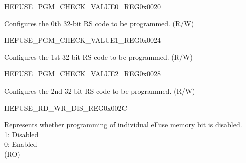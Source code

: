 \begin{register}{H}{EFUSE\_PGM\_CHECK\_VALUE0\_REG}{0x0020}\label{regdesc:EFUSEPGMCHECKVALUE0REG}
%
\regnewline%
\begin{regdesc}\begin{reglist}
\label{fielddesc:EFUSEPGMRSDATA0}\item [EFUSE\_PGM\_RS\_DATA\_0] Configures the 0th 32-bit RS code to be programmed. (R/W)
\end{reglist}\end{regdesc}
\end{register}


\begin{register}{H}{EFUSE\_PGM\_CHECK\_VALUE1\_REG}{0x0024}\label{regdesc:EFUSEPGMCHECKVALUE1REG}
%
\regnewline%
\begin{regdesc}\begin{reglist}
\label{fielddesc:EFUSEPGMRSDATA1}\item [EFUSE\_PGM\_RS\_DATA\_1] Configures the 1st 32-bit RS code to be programmed. (R/W)
\end{reglist}\end{regdesc}
\end{register}


\begin{register}{H}{EFUSE\_PGM\_CHECK\_VALUE2\_REG}{0x0028}\label{regdesc:EFUSEPGMCHECKVALUE2REG}
%
\regnewline%
\begin{regdesc}\begin{reglist}
\label{fielddesc:EFUSEPGMRSDATA2}\item [EFUSE\_PGM\_RS\_DATA\_2] Configures the 2nd 32-bit RS code to be programmed. (R/W)
\end{reglist}\end{regdesc}
\end{register}


\begin{register}{H}{EFUSE\_RD\_WR\_DIS\_REG}{0x002C}\label{regdesc:EFUSERDWRDISREG}
%
\regnewline%
\begin{regdesc}\begin{reglist}
\label{fielddesc:EFUSEWRDIS}\item [EFUSE\_WR\_DIS] Represents whether programming of individual eFuse memory bit is disabled. \\
1: Disabled\\
0: Enabled\\
(RO)
\end{reglist}\end{regdesc}
\end{register}



